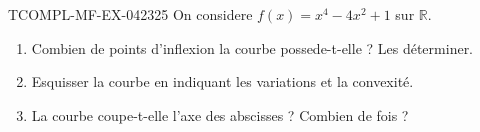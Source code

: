 \begin{exercice}{TCOMPL-MF-EX-042}{3}{25}
On considere $f(x) = x^4 - 4x^2 + 1$ sur $\mathbb{R}$.
\begin{enumerate}
  \item Combien de points d'inflexion la courbe possede-t-elle ? Les déterminer.
  \item Esquisser la courbe en indiquant les variations et la convexité.
  \item La courbe coupe-t-elle l'axe des abscisses ? Combien de fois ?
\end{enumerate}

\end{exercice}
